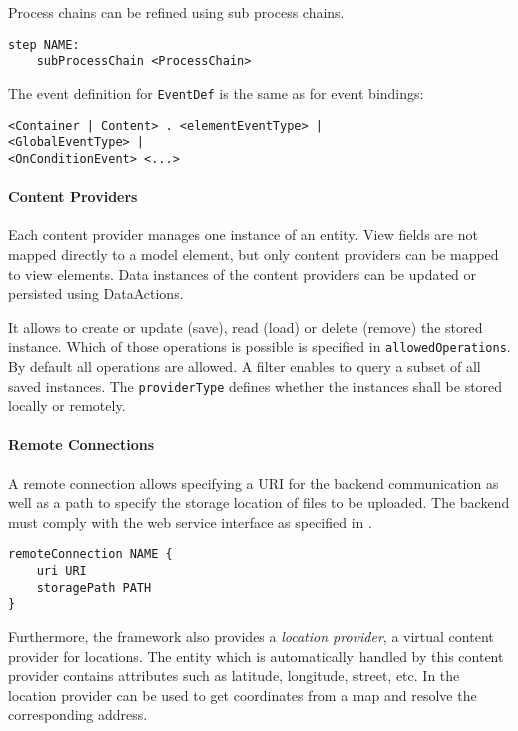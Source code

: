 Process chains can be refined using sub process chains.
\begin{lstlisting}
step NAME:
	subProcessChain <ProcessChain>
\end{lstlisting}

The event definition for \lstinline!EventDef! is the same as for event bindings:
\begin{lstlisting}
<Container | Content> . <elementEventType> |
<GlobalEventType> |
<OnConditionEvent> <...>
\end{lstlisting}

\paragraph{Content Providers}
Each content provider manages one instance of an entity. View fields are not mapped directly to a model element, but only content providers can be mapped to view elements. Data instances of the content providers can be updated or persisted using DataActions.

It allows to create or update (save), read (load) or delete (remove) the stored instance. Which of those operations is possible is specified in \lstinline!allowedOperations!. By default all operations are allowed. A filter enables to query a subset of all saved instances. The \lstinline!providerType! defines whether the instances shall be stored locally or remotely.

\paragraph{Remote Connections} 
A remote connection allows specifying a URI for the backend communication as well as a path to specify the storage location of files to be uploaded. The backend must comply with the \MD web service interface as specified in .
\begin{lstlisting}
remoteConnection NAME {
	uri URI
	storagePath PATH
}
\end{lstlisting}

Furthermore, the \MD framework also provides a \textit{location provider}, \ie a virtual content provider for locations. The entity which is automatically handled by this content provider contains attributes such as latitude, longitude, street, etc. In \mapapps the location provider can be used to get coordinates from a map and resolve the corresponding address.
